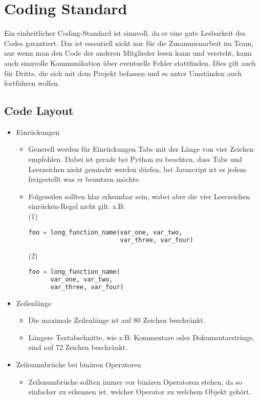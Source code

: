 \section{Coding Standard}
Ein einheitlicher Coding-Standard ist sinnvoll, da er eine gute Lesbarkeit des Codes garantiert. Das ist essentiell nicht nur für die Zusammenarbeit im Team, nur wenn man den Code der anderen Mitglieder lesen kann und versteht, kann auch sinnvolle Kommunikation über eventuelle Fehler stattfinden. Dies gilt auch für Dritte, die sich mit dem Projekt befassen und es unter Umständen auch fortführen wollen.

\subsection{Code Layout}

\begin{itemize}
\item Einrückungen
\begin{itemize}
\item Generell werden für Einrückungen Tabs mit der Länge von vier Zeichen empfohlen. Dabei ist gerade bei Python zu beachten, dass Tabs und Leerzeichen nicht gemischt werden dürfen, bei Javascript ist es jedem freigestellt was er benutzen möchte.
\item Folgezeilen sollten klar erkennbar sein, wobei aber die \grqq vier Leerzeichen einrücken\grqq -Regel nicht gilt.
z.B: \\
(1)
\begin{lstlisting}[language=python]
foo = long_function_name(var_one, var_two,
                         var_three, var_four)
\end{lstlisting}
(2) 
\begin{lstlisting}[language=python]
foo = long_function_name(
  	  var_one, var_two,
  	  var_three, var_four)   
\end{lstlisting}
\end{itemize}
\item Zeilenlänge
\begin{itemize}
\item Die maximale Zeilenlänge ist auf 80 Zeichen beschränkt. 
\item Längere Textabschnitte, wie z.B: Kommentare oder Dokumentarstrings, sind auf 72 Zeichen beschränkt.
\end{itemize}
\item Zeilenumbrüche bei binären Operatoren
\begin{itemize}
\item Zeilenumbrüche sollten immer vor binären Operatoren stehen, da so einfacher zu erkennen ist, welcher Operator zu welchem Objekt gehört.

\end{itemize}
\end{itemize}
